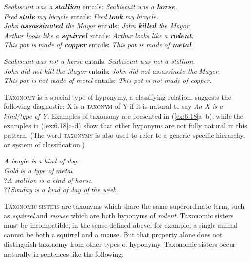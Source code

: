 \ea \label{ex:6.16}
\ea \textit{Seabiscuit was a \textbf{stallion}}  entails:  \textit{Seabiscuit was a \textbf{horse}}.\\
\ex \textit{Fred \textbf{stole} my bicycle}  entails:  \textit{Fred \textbf{took} my bicycle}.\\
\ex \textit{John \textbf{assassinated} the Mayor}  entails:  \textit{John \textbf{killed} the Mayor}.\\
\ex \textit{Arthur looks like a \textbf{squirrel}}  entails:  \textit{Arthur looks like a \textbf{rodent}}.\\
\ex \textit{This pot is made of \textbf{copper}}  entails:  \textit{This pot is made of \textbf{metal}}.
                       \z
\z

\ea \label{ex:6.17}
\ea \textit{Seabiscuit was not a horse}  entails:  \textit{Seabiscuit was not a stallion}.\\
\ex \textit{John did not kill the Mayor}  entails:  \textit{John did not assassinate the Mayor}.\\
\ex \textit{This pot is not made of metal}  entails:  \textit{This pot is not made of copper}.
  \z
\z


\textsc{Taxonomy} is a special type of hyponymy, a classifying relation. \citet[137]{Cruse1986} suggests the following diagnostic: X is a \textsc{taxonym} of Y if it is natural to say \textit{An X is a kind/type of Y}. Examples of taxonomy are presented in (\ref{ex:6.18}a--b), while the examples in (\ref{ex:6.18}c--d) show that other hyponyms are not fully natural in this pattern. (The word \textsc{taxonymy} is also used to refer to a generic-specific hierarchy, or system of classification.)


\ea \label{ex:6.18}
\ea \textit{A beagle is a kind of dog}.\\
\ex \textit{Gold is a type of metal}.\\
\ex ?\textit{A stallion is a kind of horse.}\\
\ex ??\textit{Sunday is a kind of day of the week}.
                       \z
\z


\textsc{Taxonomic sisters} are taxonyms which share the same superordinate term, such as \textit{squirrel} and \textit{mouse} which are both hyponyms of \textit{rodent}. Taxonomic sisters must be incompatible, in the sense defined above; for example, a single animal cannot be both a squirrel and a mouse. But that property alone does not distinguish taxonomy from other types of hyponymy. Taxonomic sisters occur naturally in sentences like the following:

